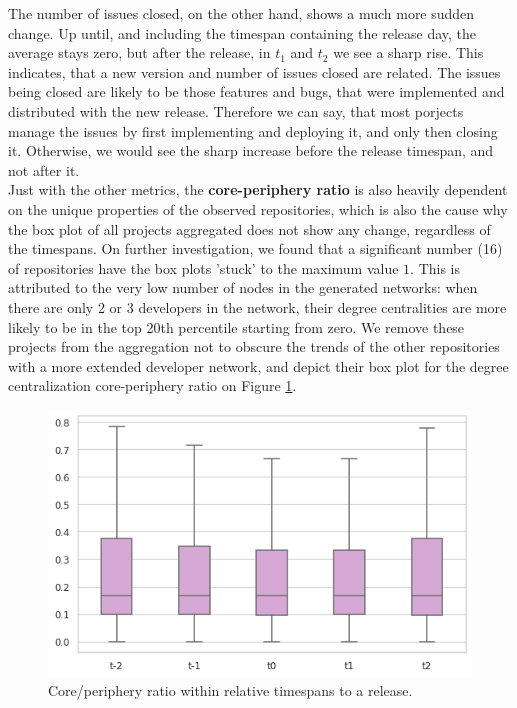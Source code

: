 The number of issues closed, on the other hand, shows a much more sudden change. Up until, and including the timespan containing the release day, the average stays zero, but after the release, in $t_1$ and $t_2$ we see a sharp rise. This indicates, that a new version and number of issues closed are related. The issues being closed are likely to be those features and bugs, that were implemented and distributed with the new release. Therefore we can say, that most porjects manage the issues by first implementing and deploying it, and only then closing it. Otherwise, we would see the sharp increase before the release timespan, and not after it. \\

Just with the other metrics, the \textbf{core-periphery ratio} is also heavily dependent on the unique properties of the observed repositories, which is also the cause why the box plot of all projects aggregated does not show any change, regardless of the timespans. On further investigation, we found that a significant number (16) of repositories have the box plots 'stuck' to the maximum value $1$. This is attributed to the very low number of nodes in the generated networks: when there are only 2 or 3 developers in the network, their degree centralities are more likely to be in the top 20th percentile starting from zero. We remove these projects from the aggregation not to obscure the trends of the other repositories with a more extended developer network, and depict their box plot for the degree centralization core-periphery ratio on Figure \ref{fig:cp-box}.

\begin{figure}
    \centering
    \includegraphics[width=\textwidth]{figures/quantitative/boxplots/cp-ratio.png}
    \caption{Core/periphery ratio within relative timespans to a release.}
    \label{fig:cp-box}
\end{figure}


